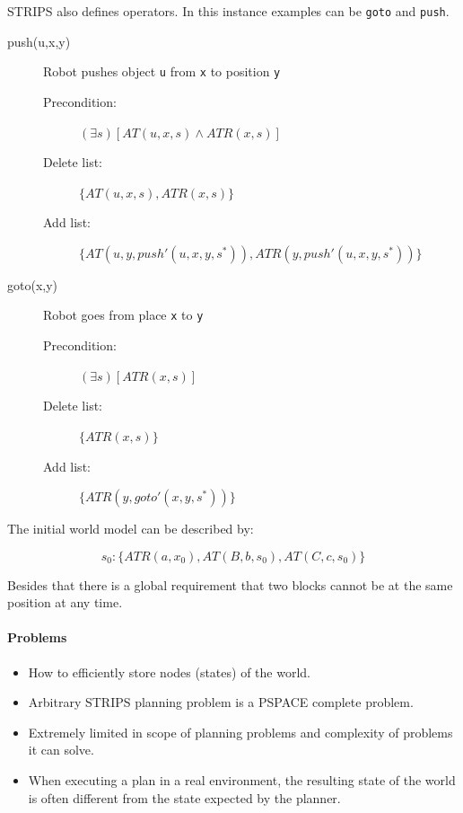 \documentclass[runningheads,a4paper]{llncs}
\begin{document}
STRIPS also defines operators. In this instance examples can be \texttt{goto}
and \texttt{push}.

\begin{description}
	\item[push(u,x,y)] Robot pushes object \texttt{u} from \texttt{x} to
		position \texttt{y}
	\begin{description}
		\item[Precondition:] $(\exists s) [AT(u,x,s) \land ATR(x,s)]$
		\item[Delete list:] $\{AT(u,x,s), ATR(x,s)\}$
		\item[Add list:] $\{AT(u,y,push'(u,x,y,s^*)), ATR(y,push'(u,x,y,s^*))\}$
	\end{description}
	\item[goto(x,y)] Robot goes from place \texttt{x} to \texttt{y}
	\begin{description}
		\item[Precondition:] $(\exists s) [ATR(x,s)]$
		\item[Delete list:] $\{ATR(x,s)\}$
		\item[Add list:] $\{ATR(y,goto'(x,y,s^*))\}$
	\end{description}
\end{description}

The initial world model can be described by:

\[
	s_0 : \{ ATR(a,x_0), AT(B,b,s_0), AT(C,c,s_0) \}
\]

Besides that there is a global requirement that two blocks cannot be at the
same position at any time.

\paragraph{Problems}

\begin{itemize}
	\item How to efficiently store nodes (states) of the
		world.~\cite{fikes1971strips}
	\item Arbitrary STRIPS planning problem is a PSPACE complete
		problem.~\cite{mcallester1991systematic}
	\item Extremely limited in scope of planning problems and complexity of
		problems it can solve.~\cite{fikes1994strips}
	\item When executing a plan in a real environment, the resulting state
		of the world is often different from the state expected by the
		planner.~\cite{fikes1994strips}
\end{itemize}
\end{document}

